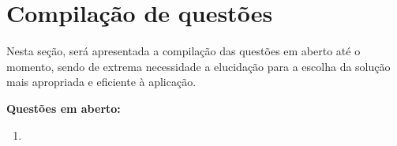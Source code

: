 \section{Compilação de questões}\label{sec:questoes}
Nesta seção, será apresentada a compilação das questões em aberto até o momento,
sendo de extrema necessidade a elucidação para a escolha da solução mais
apropriada e eficiente à aplicação.

\textbf{Questões em aberto:}
\begin{enumerate}
	\item 
\end{enumerate}


